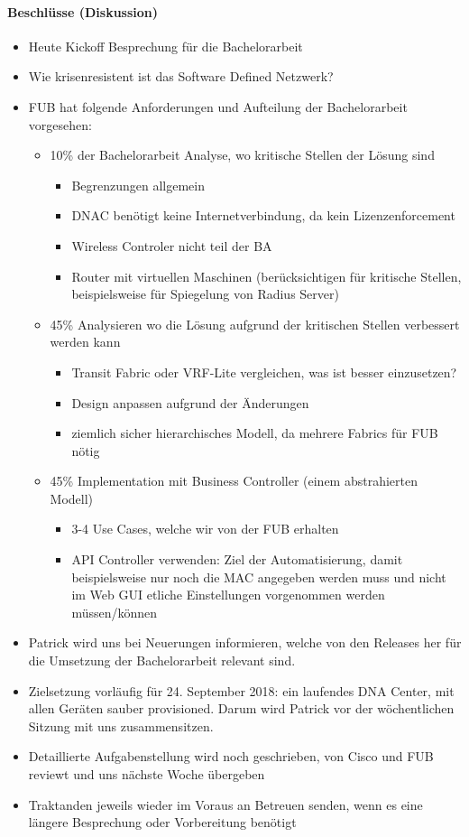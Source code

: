 \paragraph{Beschlüsse (Diskussion)}
\begin{itemize}	
	\item Heute Kickoff Besprechung für die Bachelorarbeit
	\item Wie krisenresistent ist das Software Defined Netzwerk?
	\item FUB hat folgende Anforderungen und Aufteilung der Bachelorarbeit vorgesehen:
	\begin{itemize}
		\item 10\% der Bachelorarbeit Analyse, wo kritische Stellen der Lösung sind
		\begin{itemize}
			\item Begrenzungen allgemein
			\item DNAC benötigt keine Internetverbindung, da kein Lizenzenforcement
			\item Wireless Controler nicht teil der BA
			\item Router mit virtuellen Maschinen (berücksichtigen für kritische Stellen, beispielsweise für Spiegelung von Radius Server)
		\end{itemize}
		\item 45\% Analysieren wo die Lösung aufgrund der kritischen Stellen verbessert werden kann
		\begin{itemize}
			\item Transit Fabric oder VRF-Lite vergleichen, was ist besser einzusetzen?
			\item Design anpassen aufgrund der Änderungen
			\item ziemlich sicher hierarchisches Modell, da mehrere Fabrics für FUB nötig
		\end{itemize}
		\item 45\% Implementation mit Business Controller (einem abstrahierten Modell)
		\begin{itemize}
			\item 3-4 Use Cases, welche wir von der FUB erhalten
			\item API Controller verwenden: Ziel der Automatisierung, damit beispielsweise nur noch die MAC angegeben werden muss und nicht im Web GUI etliche Einstellungen vorgenommen werden müssen/können
		\end{itemize}
	\end{itemize}
	\item Patrick wird uns bei Neuerungen informieren, welche von den Releases her für die Umsetzung der Bachelorarbeit relevant sind.
	\item Zielsetzung vorläufig für 24. September 2018: ein laufendes DNA Center, mit allen Geräten sauber provisioned. Darum wird Patrick vor der wöchentlichen Sitzung mit uns zusammensitzen.
	\item Detaillierte Aufgabenstellung wird noch geschrieben, von Cisco und FUB reviewt und uns nächste Woche übergeben	
	\item Traktanden jeweils wieder im Voraus an Betreuen senden, wenn es eine längere Besprechung oder Vorbereitung benötigt
\end{itemize}

